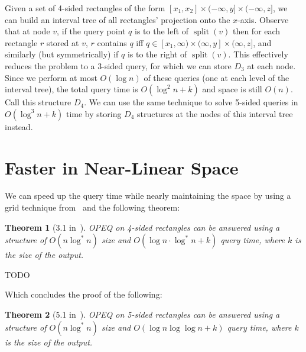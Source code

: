 \documentclass[letterpaper,12pt,twocolumn]{article}
\DeclareMathOperator{\splt}{split}
\newcommand{\BigOh}[1]{O\!\left(#1\right)}
\newcommand\D[1]{$D_{#1}$}
\newcommand\bounds[1]{[#1]}
\newcommand\lbounds[1]{(#1]} %
\newcommand\rbounds[1]{[#1)} %
\theoremstyle{plain}
\newtheorem{theorem}{Theorem}
\begin{document}
Given a set of 4-sided rectangles of the form $\bounds{x_1,x_2} \times
\lbounds{-\infty, y} \times \lbounds{-\infty,z}$, we can build an
interval tree of all rectangles' projection onto the $x$-axis.
Observe that at node $v$, if the query point $q$ is to the left of
$\splt(v)$ then for each rectangle $r$ stored at $v$, $r$ contains $q$
iff $q \in \rbounds{x_1, \infty} \times \lbounds{\infty, y} \times
\lbounds{\infty, z}$, and similarly (but symmetrically) if $q$ is to
the right of $\splt(v)$.  This effectively reduces the problem to a
3-sided query, for which we can store \D{3} at each node.  Since we
perform at most $\BigOh{\log n}$ of these queries (one at each level
of the interval tree), the total query time is $\BigOh{\log^2 n + k}$
and space is still $\BigOh{n}$.  Call this structure \D{4}.  We can
use the same technique to solve 5-sided queries in $\BigOh{\log^3 n +
  k}$ time by storing \D{4} structures at the nodes of this interval
tree instead.

\section{Faster in Near-Linear Space}

We can speed up the query time while nearly maintaining the space by
using a grid technique from~\cite{alstrup2000new} and the following
theorem:

\begin{theorem}[3.1 in~\cite{saladi2015improved}]

  OPEQ on 4-sided rectangles can be answered using a structure of
  $\BigOh{n\log^* n}$ size and $\BigOh{\log n \cdot \log^* n + k}$
  query time, where $k$ is the size of the output.

\end{theorem}

TODO

Which concludes the proof of the following:

\begin{theorem}[5.1 in~\cite{saladi2015improved}]

  OPEQ on 5-sided rectangles can be answered using a structure of
  $\BigOh{n\log^* n}$ size and $\BigOh{\log n \log\log n + k}$ query
  time, where $k$ is the size of the output.

\end{theorem}



\end{document}
